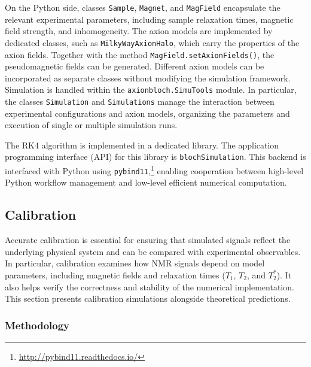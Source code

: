 On the Python side, classes \texttt{Sample}, \texttt{Magnet}, and \texttt{MagField} encapsulate the relevant experimental parameters, including sample relaxation times, magnetic field strength, and inhomogeneity. 
The axion models are implemented by dedicated classes, such as \texttt{MilkyWayAxionHalo}, which carry the properties of the axion fields. Together with the method \texttt{MagField.setAxionFields()}, the pseudomagnetic fields can be generated. 
Different axion models can be incorporated as separate classes without modifying the simulation framework. 
Simulation is handled within the \texttt{axionbloch.SimuTools} module. 
In particular, the classes \texttt{Simulation} and \texttt{Simulations} manage the interaction between experimental configurations and axion models, organizing the parameters and execution of single or multiple simulation runs. 

The RK4 algorithm is implemented in a dedicated  library. 
The application programming interface (API) for this library is \texttt{blochSimulation}. 
This  backend is interfaced with Python using \texttt{pybind11},\footnote{\url{http://pybind11.readthedocs.io/}} enabling cooperation between high-level Python workflow management and low-level efficient numerical computation.


\subsection{Calibration}
\label{sec:calibration}

Accurate calibration is essential for ensuring that simulated signals reflect the underlying physical system and can be compared with experimental observables. 
In particular, calibration examines how NMR signals depend on model parameters, including magnetic fields and relaxation times ($T_1$, $T_2$, and $T_2^*$). 
It also helps verify the correctness and stability of the numerical implementation. 
This section presents calibration simulations alongside theoretical predictions. 

\subsubsection{Methodology}
\label{sec:calibration:methodology}

